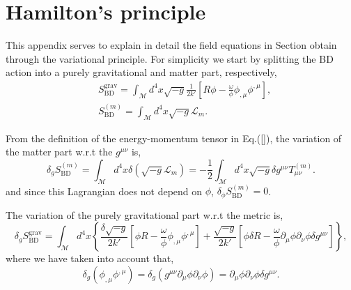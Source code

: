 \chapter{Hamilton's principle}
\label{app:brans}
This appendix serves to explain in detail the field equations in Section obtain through the variational principle. For simplicity we start by splitting the BD action into a purely gravitational and matter part, respectively,
\begin{align}
    &S^{\mathrm{grav}}_{\mathrm{BD}}=\int_{\mathcal{M}}d^4x \sqrt{-g}\frac{1}{2k'}\left[R\phi - \frac{\omega}{\phi}\phi_{,\mu}\phi^{,\mu}\right],
    \label{eqn:appendix_bd_action}\\
    &S^{(m)}_{\mathrm{BD}}=\int_{\mathcal{M}}d^4x \sqrt{-g}\mathcal{L}_m.
\end{align}

From the definition of the energy-momentum tensor in Eq.(\ref{}), the variation of the matter part w.r.t the $g^{\mu\nu}$ is,
\begin{equation}
    \delta_g S_{\mathrm{BD}}^{(m)}=\int_{\mathcal{M}} d^4 x \delta\left(\sqrt{-g} \mathcal{L}_m\right)=-\frac{1}{2}\int_{\mathcal{M}} d^4 x \sqrt{-g} \delta g^{\mu \nu} T_{\mu \nu}^{(m)}.
\end{equation}
and since this Lagrangian does not depend on $\phi$, $\delta_\phi S^{(m)}_{\mathrm{BD}}=0$.

The variation of the purely gravitational part w.r.t the metric is,
\begin{equation}
    \delta_g S_{\mathrm{BD}}^{\mathrm{grav}}=\int_{\mathcal{M}} d^4 x\left\{\frac{\delta \sqrt{-g}}{2k'}\left[\phi R-\frac{\omega}{\phi}\phi_{,\mu}\phi^{,\mu}\right]+\frac{\sqrt{-g}}{2k'}\left[\phi\delta R-\frac{\omega}{\phi} \partial_\mu \phi \partial_\nu \phi \delta g^{\mu \nu}\right]\right\},
    \label{eqn:appendix_grav_d_action}
\end{equation}
where we have taken into account that,
\begin{equation}
\delta_g\left(\phi_{,\mu}\phi^{,\mu}\right)=\delta_g\left(g^{\mu\nu}\partial_\mu\phi\partial_\nu\phi\right)=\partial_\mu\phi\partial_\nu\phi \delta g^{\mu\nu}.
\end{equation}

